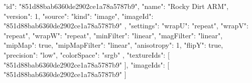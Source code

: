 {
  "id": "851d88bab6360de2902ce1a78a5787b9",
  "name": "Rocky Dirt ARM",
  "version": 1,
  "source": {
    "kind": "image",
    "imageId": "851d88bab6360de2902ce1a78a5787b9"
  },
  "settings": {
    "wrapU": "repeat",
    "wrapV": "repeat",
    "wrapW": "repeat",
    "minFilter": "linear",
    "magFilter": "linear",
    "mipMap": true,
    "mipMapFilter": "linear",
    "anisotropy": 1,
    "flipY": true,
    "precision": "low",
    "colorSpace": "srgb"
  },
  "textureIds": [
    "851d88bab6360de2902ce1a78a5787b9"
  ],
  "imageIds": [
    "851d88bab6360de2902ce1a78a5787b9"
  ]
}
